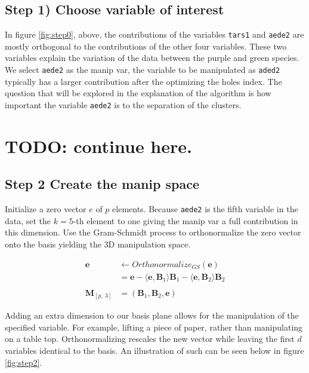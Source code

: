 \documentclass{monashthesis}
\begin{document}
\subsection{Step 1) Choose variable of
interest}\label{step-1-choose-variable-of-interest}

In figure \ref{fig:step0}, above, the contributions of the variables
\texttt{tars1} and \texttt{aede2} are mostly orthogonal to the
contributions of the other four variables. These two variables explain
the variation of the data between the purple and green species. We
select \texttt{aede2} as the manip var, the variable to be manipulated
as \texttt{aded2} typically has a larger contribution after the
optimizing the holes index. The question that will be explored in the
explanation of the algorithm is how important the variable
\texttt{aede2} is to the separation of the clusters.

\section{TODO: continue here.}\label{todo-continue-here.}

\subsection{Step 2 Create the manip
space}\label{step-2-create-the-manip-space}

Initialize a zero vector \(e\) of \(p\) elements. Because \texttt{aede2}
is the fifth variable in the data, set the \(k=5\)-th element to one
giving the manip var a full contribution in this dimension. Use the
Gram-Schmidt process to orthonormalize the zero vector onto the basis
yielding the 3D manipulation space.

\begin{align*}
  \textbf{e} &\leftarrow Orthonormalize_{GS}(\textbf{e}) \\
  &= \textbf{e} - \langle \textbf{e},\textbf{B}_1 \rangle \textbf{B}_1 - \langle \textbf{e}, \textbf{B}_2 \rangle \textbf{B}_2 \\
  \\
  \textbf{M}_{[p,~3]} &= (\textbf{B}_1,\textbf{B}_2,\textbf{e})
\end{align*}

Adding an extra dimension to our basis plane allows for the manipulation
of the specified variable. For example, lifting a piece of paper, rather
than manipulating on a table top. Orthonormalizing rescales the new
vector while leaving the first \(d\) variables identical to the basis.
An illustration of such can be seen below in figure \ref{fig:step2}.
\end{document}
